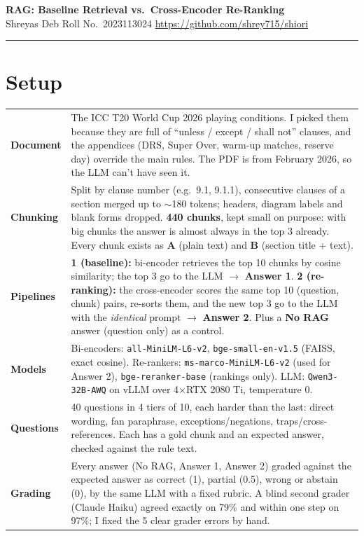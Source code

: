 \documentclass[10pt,a4paper]{article}
\begin{document}
\thispagestyle{first}

{\sffamily
{\LARGE\bfseries\color{accent} RAG: Baseline Retrieval vs.\ Cross-Encoder Re-Ranking}\\[5pt]
{\large Shreyas Deb \quad{\color{rule}|}\quad Roll No.\ 2023113024} \hfill {\small\url{https://github.com/shrey715/shiori}}
}
\vspace{3pt}
{\color{rule}\hrule height 0.8pt}
\vspace{6pt}

\section*{Setup}

\begin{tabularx}{\linewidth}{@{}L{2.2cm}Y@{}}
\textbf{Document} & The ICC T20 World Cup 2026 playing conditions. I picked them because they are full of ``unless / except / shall not'' clauses, and the appendices (DRS, Super Over, warm-up matches, reserve day) override the main rules. The PDF is from February 2026, so the LLM can't have seen it. \\
\textbf{Chunking} & Split by clause number (e.g.\ 9.1, 9.1.1), consecutive clauses of a section merged up to $\sim$180 tokens; headers, diagram labels and blank forms dropped. \textbf{440 chunks}, kept small on purpose: with big chunks the answer is almost always in the top 3 already. Every chunk exists as \textbf{A} (plain text) and \textbf{B} (section title + text). \\
\textbf{Pipelines} & \textbf{1 (baseline):} bi-encoder retrieves the top 10 chunks by cosine similarity; the top 3 go to the LLM $\to$ \textbf{Answer 1}. \textbf{2 (re-ranking):} the cross-encoder scores the same top 10 (question, chunk) pairs, re-sorts them, and the new top 3 go to the LLM with the \emph{identical} prompt $\to$ \textbf{Answer 2}. Plus a \textbf{No RAG} answer (question only) as a control. \\
\textbf{Models} & Bi-encoders: \texttt{all-MiniLM-L6-v2}, \texttt{bge-small-en-v1.5} (FAISS, exact cosine). Re-rankers: \texttt{ms-marco-MiniLM-L6-v2} (used for Answer 2), \texttt{bge-reranker-base} (rankings only). LLM: \texttt{Qwen3-32B-AWQ} on vLLM over 4$\times$RTX 2080 Ti, temperature 0. \\
\textbf{Questions} & 40 questions in 4 tiers of 10, each harder than the last: direct wording, fan paraphrase, exceptions/negations, traps/cross-references. Each has a gold chunk and an expected answer, checked against the rule text. \\
\textbf{Grading} & Every answer (No RAG, Answer 1, Answer 2) graded against the expected answer as correct (1), partial (0.5), wrong or abstain (0), by the same LLM with a fixed rubric. A blind second grader (Claude Haiku) agreed exactly on 79\% and within one step on 97\%; I fixed the 5 clear grader errors by hand. \\
\end{tabularx}
\end{document}
